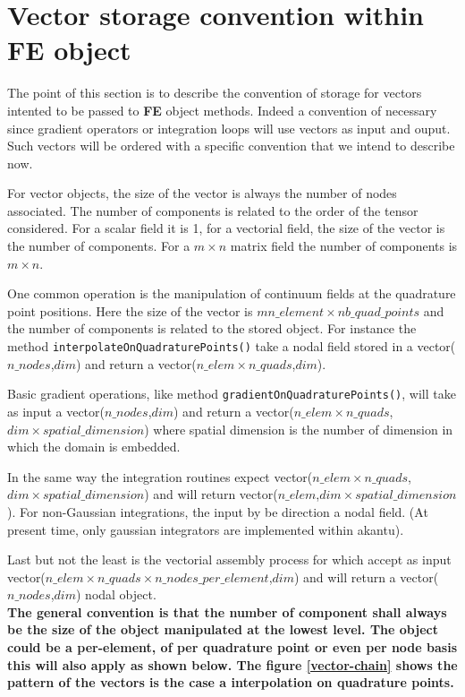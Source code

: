 \documentclass[a4paper,11pt]{book}
\begin{document}
\section{Vector storage convention within FE object\label{sec:FE-convention}}
The point of this section is to describe the convention of storage for
vectors intented to be passed to {\bf FE} object methods. 
Indeed a convention of necessary since gradient operators
or integration loops will use vectors as input and ouput. 
Such vectors will be ordered with a specific convention that 
we intend to describe now. 

For vector objects, the size of the vector is always 
the number of nodes associated. The number of components 
is related to the order of the tensor considered. For a scalar
field it is 1, for a vectorial field, the size of the vector 
is the number of components. For a $m\times n$ matrix field 
the number of components is $m\times n$.  

One common operation is the manipulation of continuum fields
at the quadrature point positions. Here the size of the 
vector is $mn\_element \times nb\_quad\_points$ and the number 
of components is related to the stored object. For instance
the method \verb$interpolateOnQuadraturePoints()$ take a nodal
field stored in a vector($n\_nodes$,$dim$) and return a 
vector($n\_elem \times n\_quads$,$dim$).

Basic gradient operations, like method \verb$gradientOnQuadraturePoints()$, 
will take as input a vector($n\_nodes$,$dim$) and return 
a vector($n\_elem \times n\_quads$,$dim\times spatial\_dimension$)
where spatial dimension is the number of dimension in which the 
domain is embedded. 

In the same way the integration routines expect 
vector($n\_elem \times n\_quads$,$dim\times spatial\_dimension$)
and will return vector($n\_elem$,$dim\times spatial\_dimension$).
For non-Gaussian integrations, the input by be direction a nodal field.
(At present time, only gaussian integrators are implemented within akantu).

Last but not the least is the vectorial assembly process for which accept as input
vector($n\_elem \times n\_quads \times n\_nodes\_per\_element$,$dim$) 
and will return a vector($n\_nodes$,$dim$) nodal object.\\

{\bf The general convention is that the number of component shall 
always be the size of the object manipulated at the lowest level.
The object could be a per-element, of per quadrature point or even per node
basis this will also apply as shown below. The figure \ref{vector-chain}
shows the pattern of the vectors is the case a interpolation on quadrature points.}
\end{document}
